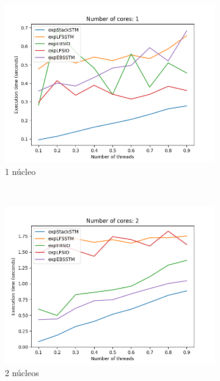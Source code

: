 \clearpage
\begin{figure}[H]
    \centering
    \begin{subfigure}[b]{0.49\textwidth}
        \includegraphics[width=\textwidth]{images/pushPercentages/plots/1.png}
        \caption{1 núcleo}
        \label{subfig:pushPercentages-1core}
    \end{subfigure}
    ~
    \begin{subfigure}[b]{0.49\textwidth}
        \includegraphics[width=\textwidth]{images/pushPercentages/plots/2.png}
        \caption{2 núcleos}
        \label{subfig:pushPercentages-2core}
    \end{subfigure}
    ~
    \begin{subfigure}[b]{0.5\textwidth}

\end{subfigure}
\end{figure}
